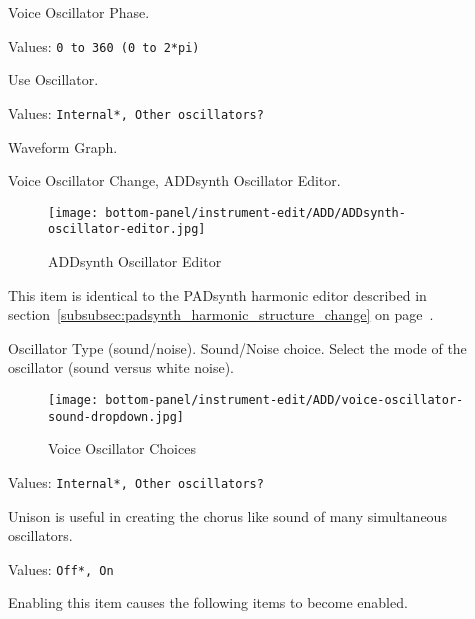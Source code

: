    Voice Oscillator Phase.

   Values: \texttt{0 to 360 (0 to 2*pi)}

   Use Oscillator.

   Values: \texttt{Internal*, Other oscillators?}

   Waveform Graph.

   Voice Oscillator Change,
   ADDsynth Oscillator Editor.

\begin{figure}[H]
   \centering 
   \texttt{[image: bottom-panel/instrument-edit/ADD/ADDsynth-oscillator-editor.jpg]}
   \caption{ADDsynth Oscillator Editor}
   \label{fig:addsynth_oscillator_editor}
\end{figure}

   This item is identical to the PADsynth harmonic editor described in
   section~\ref{subsubsec:padsynth_harmonic_structure_change} on
   page~\pageref{subsubsec:padsynth_harmonic_structure_change}.

   Oscillator Type (sound/noise).
   Sound/Noise choice.
   Select the mode of the oscillator (sound versus white noise).

\begin{figure}[H]
   \centering 
   \texttt{[image: bottom-panel/instrument-edit/ADD/voice-oscillator-sound-dropdown.jpg]}
   \caption{Voice Oscillator Choices}
   \label{fig:voice_oscillator_choices}
\end{figure}

   Values: \texttt{Internal*, Other oscillators?}

   Unison is useful in creating the chorus like sound of many simultaneous
   oscillators.

   Values: \texttt{Off*, On}

   Enabling this item causes the following items to become enabled.

